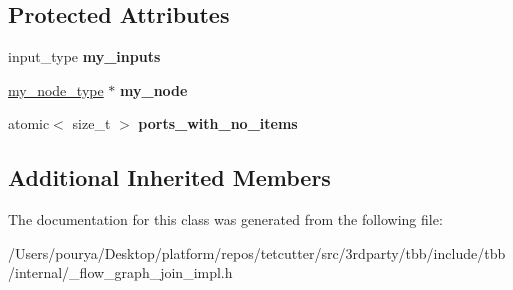 \subsection*{Protected Attributes}
\begin{DoxyCompactItemize}
\item 
\hypertarget{classinternal_1_1join__node__FE_3_01queueing_00_01InputTuple_00_01OutputTuple_01_4_ac18c67c1eb7c84c11f61eb5e99537531}{}input\+\_\+type {\bfseries my\+\_\+inputs}\label{classinternal_1_1join__node__FE_3_01queueing_00_01InputTuple_00_01OutputTuple_01_4_ac18c67c1eb7c84c11f61eb5e99537531}

\item 
\hypertarget{classinternal_1_1join__node__FE_3_01queueing_00_01InputTuple_00_01OutputTuple_01_4_a045260dd244a1a3079fa687f075aa6fa}{}\hyperlink{classinternal_1_1join__node__base}{my\+\_\+node\+\_\+type} $\ast$ {\bfseries my\+\_\+node}\label{classinternal_1_1join__node__FE_3_01queueing_00_01InputTuple_00_01OutputTuple_01_4_a045260dd244a1a3079fa687f075aa6fa}

\item 
\hypertarget{classinternal_1_1join__node__FE_3_01queueing_00_01InputTuple_00_01OutputTuple_01_4_a91b8d8ca01f7e923c51d0c710c083aed}{}atomic$<$ size\+\_\+t $>$ {\bfseries ports\+\_\+with\+\_\+no\+\_\+items}\label{classinternal_1_1join__node__FE_3_01queueing_00_01InputTuple_00_01OutputTuple_01_4_a91b8d8ca01f7e923c51d0c710c083aed}

\end{DoxyCompactItemize}
\subsection*{Additional Inherited Members}


The documentation for this class was generated from the following file\+:\begin{DoxyCompactItemize}
\item 
/\+Users/pourya/\+Desktop/platform/repos/tetcutter/src/3rdparty/tbb/include/tbb/internal/\+\_\+flow\+\_\+graph\+\_\+join\+\_\+impl.\+h\end{DoxyCompactItemize}
